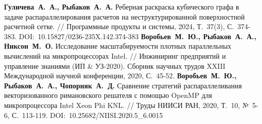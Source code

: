\begin{thebibliography}{99}
%
\textbf{Гуличева~А.~А., Рыбаков~А.~А.} Реберная раскраска кубического графа в задаче распараллелирования расчетов на неструктурированной поверхностной расчетной сетке. // Программные продукты и системы, 2024, Т.~37(3), С.~374-383. DOI:~10.15827/0236-235X.142.374-383
%
\textbf{Воробьев~М.~Ю., Рыбаков~А.~А., Никсон~М.~О.} Исследование масштабируемости плотных параллельных вычислений на микропроцессорах Intel. // Инжиниринг предприятий и управление знаниями (ИП \& УЗ-2020). Сборник научных трудов XXIII Международной научной конференции, 2020, С.~45-52.
%
\textbf{Воробьев~М.~Ю., Рыбаков~А.~А., Чопорняк~А.~Д.} Сравнение стратегий распараллеливания векторизованного римановского решателя с помощью OpenMP для микропроцессора Intel Xeon Phi KNL. // Труды НИИСИ РАН, 2020, Т.~10, №~5-6, С.~113-119. DOI:~10.25682/NIISI.2020.5\_6.0015
%






\end{thebibliography}
